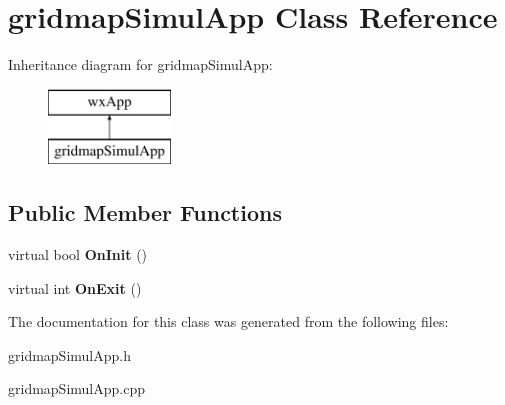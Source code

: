 \hypertarget{classgridmapSimulApp}{}\section{gridmap\+Simul\+App Class Reference}
\label{classgridmapSimulApp}
Inheritance diagram for gridmap\+Simul\+App\+:\begin{figure}[H]
\begin{center}
\leavevmode
\includegraphics[height=2.000000cm]{classgridmapSimulApp}
\end{center}
\end{figure}
\subsection*{Public Member Functions}
\begin{DoxyCompactItemize}
\item 
\mbox{\label{classgridmapSimulApp_abc43c8f695eb785e35a33f72ac180321}} 
virtual bool {\bfseries On\+Init} ()
\item 
\mbox{\label{classgridmapSimulApp_a4f8e8dc4a836ed655bde844103969e68}} 
virtual int {\bfseries On\+Exit} ()
\end{DoxyCompactItemize}


The documentation for this class was generated from the following files\+:\begin{DoxyCompactItemize}
\item 
gridmap\+Simul\+App.\+h\item 
gridmap\+Simul\+App.\+cpp\end{DoxyCompactItemize}
